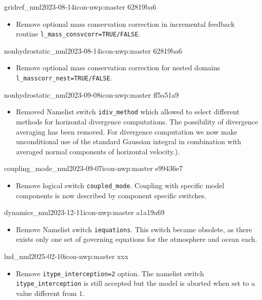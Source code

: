 \begin{changeitem}{gridref\_nml}{2023-08-14}{icon-nwp:master 62819ba6}
  \begin{itemize}
   \item Remove optional mass conservation correction in incremental feedback routine \texttt{l\_mass\_consvcorr=TRUE/FALSE}.
  \end{itemize}
\end{changeitem}

\begin{changeitem}{nonhydrostatic\_nml}{2023-08-14}{icon-nwp:master 62819ba6}
  \begin{itemize}
   \item Remove optional mass conservation correction for nested domains \texttt{l\_masscorr\_nest=TRUE/FALSE}.
  \end{itemize}
\end{changeitem}

\begin{changeitem}{nonhydrostatic\_nml}{2023-09-08}{icon-nwp:master ff5a51a9}
  \begin{itemize}
   \item Removed Namelist switch \texttt{idiv\_method} which allowed to select different methods for horizontal divergence computations. The possibility of divergence averaging has been removed. For divergence computation we now make unconditional use of the standard Gaussian integral in combination with averaged normal components of horizontal velocity.).
  \end{itemize}
\end{changeitem}

\begin{changeitem}{coupling\_mode\_nml}{2023-09-07}{icon-nwp:master e99436e7}
  \begin{itemize}
   \item Remove logical switch \texttt{coupled\_mode}. Coupling with specific
     model components is now described by component specific switches.
  \end{itemize}
\end{changeitem}

\begin{changeitem}{dynamics\_nml}{2023-12-11}{icon-nwp:master a1a19a69}
  \begin{itemize}
   \item Remove Namelist switch \texttt{iequations}. This switch became obsolete, as there exists only one set of governing equations for the atmosphere and ocean each.
  \end{itemize}
\end{changeitem}

\begin{changeitem}{lnd\_nml}{2025-02-10}{icon-nwp:master xxx}
  \begin{itemize}
    \item Remove \texttt{itype\_interception=2} option. The namelist switch \texttt{itype\_interception} is still accepted but the model is aborted when set to a value different from $1$.
  \end{itemize}
\end{changeitem}
